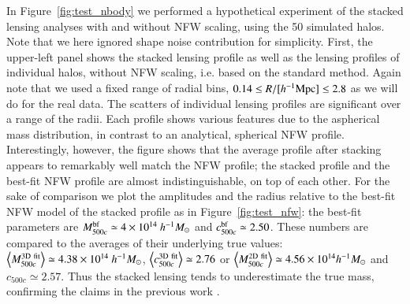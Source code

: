 \documentclass[iop, apj]{emulateapj}
\def\ave#1{\left\langle #1 \right\rangle}
\newcommand{\?}{\stackrel{?}{=}}
\begin{document}
In Figure~\ref{fig:test_nbody} we performed a hypothetical experiment of
the stacked lensing analyses with and without NFW scaling, using the 50
simulated halos. Note that we here ignored shape noise contribution for
simplicity. First, the upper-left panel shows the stacked lensing
profile as well as the lensing profiles of individual halos, without NFW
scaling, i.e. based on the standard method. Again note that we used a
fixed range of radial bins, $0.14\le R/[h^{-1}{\rm Mpc}]\le 2.8$ as we
will do for the real data.  The scatters of individual lensing profiles
are significant over a range of the radii.  Each profile shows various
features due to the aspherical mass distribution, in contrast to an
analytical, spherical NFW profile.  Interestingly, however, the figure
shows that the average profile after stacking appears to remarkably well
match the NFW profile; the stacked profile and the best-fit NFW profile
are almost indistinguishable, on top of each other. For the sake of
comparison we plot the amplitudes and the radius relative to the
best-fit NFW model of the stacked profile as in
Figure~\ref{fig:test_nfw}: the best-fit parameters are $M^{\rm
bf}_{500c}\simeq 4\times 10^{14}~h^{-1}M_\odot$ and $c^{\rm
bf}_{500c}\simeq 2.50$. These numbers are compared to the averages of
their underlying true values: $\ave{M^{\rm 3D~fit}_{500c}}\simeq
4.38\times 10^{14}~h^{-1}M_\odot$, $\ave{c^{\rm 3D~fit}_{500c}}\simeq
2.76$ or $\ave{M^{\rm 2D~fit}_{500c}}\simeq 4.56\times
10^{14}h^{-1}M_\odot$ and $c_{500c}\simeq 2.57$.  Thus the stacked
lensing tends to underestimate the true mass, confirming the claims in
the previous work
\citep{Mandelbaumetal:05,Meneghettietal:10,BeckerKravtsov:11,vandenBoschetal:13,Meneghettietal:14}.
\end{document}
